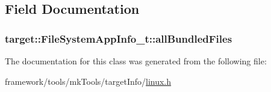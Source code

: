 \subsection{Field Documentation}
\subsubsection[{\texorpdfstring{all\+Bundled\+Files}{allBundledFiles}}]{ target\+::\+File\+System\+App\+Info\+\_\+t\+::all\+Bundled\+Files}\hypertarget{classtarget_1_1_file_system_app_info__t_a4356370104b5837bd08e5e72694a026d}{}\label{classtarget_1_1_file_system_app_info__t_a4356370104b5837bd08e5e72694a026d}


The documentation for this class was generated from the following file\+:\begin{DoxyCompactItemize}
\item 
framework/tools/mk\+Tools/target\+Info/\hyperlink{linux_8h}{linux.\+h}\end{DoxyCompactItemize}

